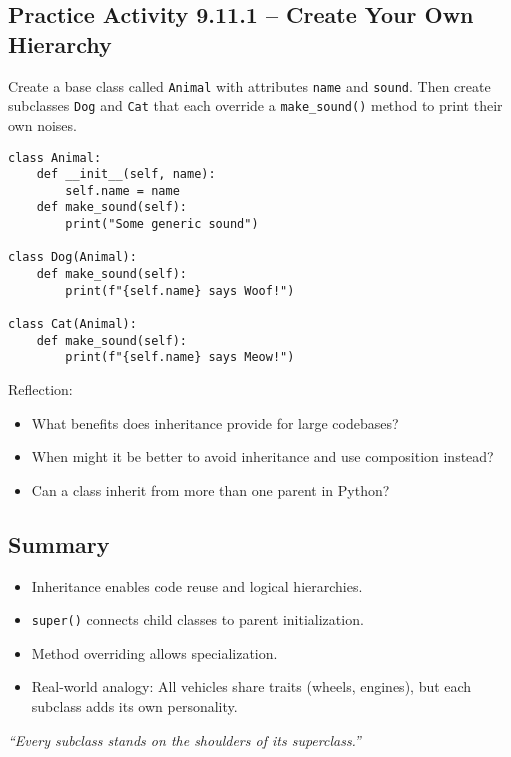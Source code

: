 \subsection*{Practice Activity 9.11.1 – Create Your Own Hierarchy}

Create a base class called \texttt{Animal} with attributes \texttt{name} and \texttt{sound}.
Then create subclasses \texttt{Dog} and \texttt{Cat} that each override a \texttt{make\_sound()}
method to print their own noises.

\begin{verbatim}
class Animal:
    def __init__(self, name):
        self.name = name
    def make_sound(self):
        print("Some generic sound")

class Dog(Animal):
    def make_sound(self):
        print(f"{self.name} says Woof!")

class Cat(Animal):
    def make_sound(self):
        print(f"{self.name} says Meow!")
\end{verbatim}

Reflection:
\begin{itemize}
    \item What benefits does inheritance provide for large codebases?
    \item When might it be better to avoid inheritance and use composition instead?
    \item Can a class inherit from more than one parent in Python?
\end{itemize}

\subsection*{Summary}

\begin{itemize}
    \item Inheritance enables code reuse and logical hierarchies.
    \item \texttt{super()} connects child classes to parent initialization.
    \item Method overriding allows specialization.
    \item Real-world analogy: All vehicles share traits (wheels, engines), but each subclass
    adds its own personality.
\end{itemize}

\begin{center}
\textit{“Every subclass stands on the shoulders of its superclass.”}
\end{center}

